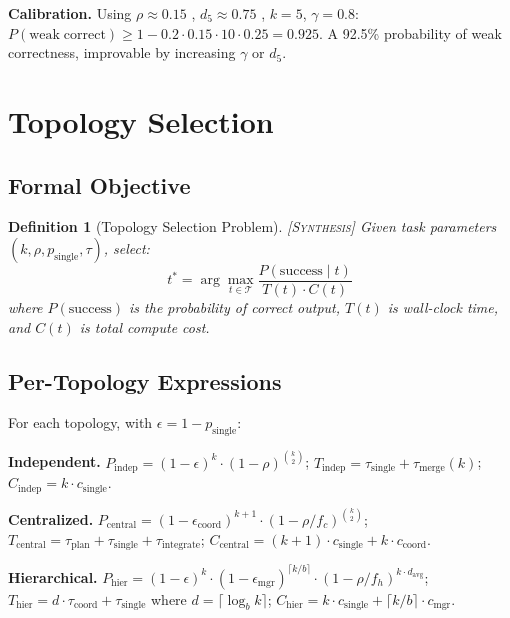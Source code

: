 \documentclass[11pt, a4paper, copyright]{googledeepmind}
\newtheorem{definition}{Definition}[section]
\newcommand{\synthesis}{\textsc{[Synthesis]}}
\begin{document}
\textbf{Calibration.}
Using $\rho \approx 0.15$ \citep{KasiSarma2013}, $d_5 \approx 0.75$ \citep{Sousa2018}, $k = 5$, $\gamma = 0.8$:
$P(\mathrm{weak\;correct}) \geq 1 - 0.2 \cdot 0.15 \cdot 10 \cdot 0.25 = 0.925$.
A 92.5\% probability of weak correctness, improvable by increasing $\gamma$ or $d_5$.


\section{Topology Selection}
\label{sec:topology}

\subsection{Formal Objective}

\begin{definition}[Topology Selection Problem] \synthesis{}
Given task parameters $(k, \rho, p_{\mathrm{single}}, \tau)$, select:
\begin{equation}
\label{eq:topology-obj}
  t^* = \arg\max_{t \in \mathcal{T}} \frac{P(\mathrm{success} \mid t)}{T(t) \cdot C(t)}
\end{equation}
where $P(\mathrm{success})$ is the probability of correct output, $T(t)$ is wall-clock time, and $C(t)$ is total compute cost.
\end{definition}

\subsection{Per-Topology Expressions}

For each topology, with $\epsilon = 1 - p_{\mathrm{single}}$:

\medskip
\noindent\textbf{Independent.}
$P_{\mathrm{indep}} = (1-\epsilon)^k \cdot (1-\rho)^{\binom{k}{2}}$;
$T_{\mathrm{indep}} = \tau_{\mathrm{single}} + \tau_{\mathrm{merge}}(k)$;
$C_{\mathrm{indep}} = k \cdot c_{\mathrm{single}}$.

\medskip
\noindent\textbf{Centralized.}
$P_{\mathrm{central}} = (1-\epsilon_{\mathrm{coord}})^{k+1} \cdot (1-\rho/f_c)^{\binom{k}{2}}$;
$T_{\mathrm{central}} = \tau_{\mathrm{plan}} + \tau_{\mathrm{single}} + \tau_{\mathrm{integrate}}$;
$C_{\mathrm{central}} = (k+1) \cdot c_{\mathrm{single}} + k \cdot c_{\mathrm{coord}}$.

\medskip
\noindent\textbf{Hierarchical.}
$P_{\mathrm{hier}} = (1-\epsilon)^k \cdot (1-\epsilon_{\mathrm{mgr}})^{\lceil k/b \rceil} \cdot (1-\rho/f_h)^{k \cdot d_{\mathrm{avg}}}$;
$T_{\mathrm{hier}} = d \cdot \tau_{\mathrm{coord}} + \tau_{\mathrm{single}}$ where $d = \lceil \log_b k \rceil$;
$C_{\mathrm{hier}} = k \cdot c_{\mathrm{single}} + \lceil k/b \rceil \cdot c_{\mathrm{mgr}}$.
\end{document}
